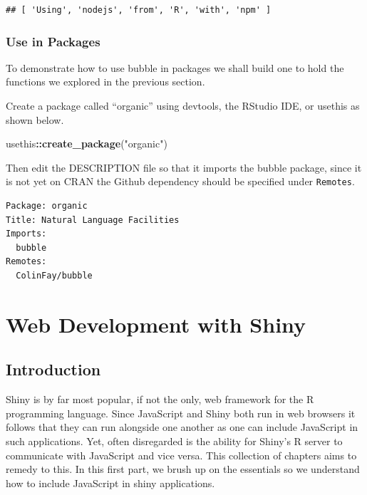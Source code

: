 \documentclass[
]{krantz}
\makeatletter
\newenvironment{Shaded}{\begin{snugshade}}{\end{snugshade}}
\newcommand{\KeywordTok}[1]{\textcolor[rgb]{0.27,0.27,0.27}{\textbf{#1}}}
\newcommand{\NormalTok}[1]{#1}
\newcommand{\OperatorTok}[1]{\textcolor[rgb]{0.43,0.43,0.43}{\textbf{#1}}}
\newcommand{\StringTok}[1]{\textcolor[rgb]{0.5,0.5,0.5}{#1}}
\newenvironment{kframe}{%
\medskip{}
\setlength{\fboxsep}{.8em}
 \def\at@end@of@kframe{}%
 \ifinner\ifhmode%
  \def\at@end@of@kframe{\end{minipage}}%
  \begin{minipage}{\columnwidth}%
 \fi\fi%
 \def\FrameCommand##1{\hskip\@totalleftmargin \hskip-\fboxsep
 \colorbox{shadecolor}{##1}\hskip-\fboxsep
     \hskip-\linewidth \hskip-\@totalleftmargin \hskip\columnwidth}%
 \MakeFramed {\advance\hsize-\width
   \@totalleftmargin\z@ \linewidth\hsize
   \@setminipage}}%
 {\par\unskip\endMakeFramed%
 \at@end@of@kframe}
\renewenvironment{Shaded}{\begin{kframe}}{\end{kframe}}
\makeatother
\begin{document}
\begin{verbatim}
## [ 'Using', 'nodejs', 'from', 'R', 'with', 'npm' ]
\end{verbatim}

\hypertarget{use-in-packages-1}{%
\section*{Use in Packages}\label{use-in-packages-1}}


To demonstrate how to use bubble in packages we shall build one to hold the functions we explored in the previous section.

Create a package called ``organic'' using devtools, the RStudio IDE, or usethis as shown below.

\begin{Shaded}
\begin{Highlighting}[]
\NormalTok{usethis}\OperatorTok{::}\KeywordTok{create\_package}\NormalTok{(}\StringTok{"organic"}\NormalTok{)}
\end{Highlighting}
\end{Shaded}

Then edit the DESCRIPTION file so that it imports the bubble package, since it is not yet on CRAN the Github dependency should be specified under \texttt{Remotes}.

\begin{verbatim}
Package: organic
Title: Natural Language Facilities
Imports:
  bubble
Remotes:
  ColinFay/bubble
\end{verbatim}

\hypertarget{part-web-development-with-shiny}{%
\part{Web Development with Shiny}\label{part-web-development-with-shiny}}

\hypertarget{introduction-1}{%
\chapter{Introduction}\label{introduction-1}}

Shiny is by far most popular, if not the only, web framework for the R programming language. Since JavaScript and Shiny both run in web browsers it follows that they can run alongside one another as one can include JavaScript in such applications. Yet, often disregarded is the ability for Shiny's R server to communicate with JavaScript and vice versa. This collection of chapters aims to remedy to this. In this first part, we brush up on the essentials so we understand how to include JavaScript in shiny applications.
\end{document}
